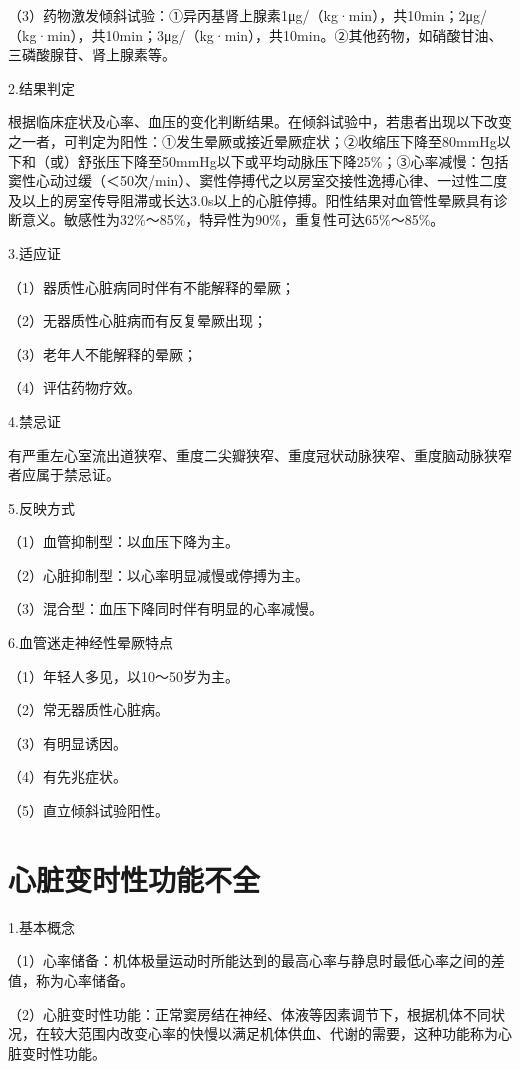 （3）药物激发倾斜试验：①异丙基肾上腺素1μg/（kg·min），共10min；2μg/（kg·min），共10min；3μg/（kg·min），共10min。②其他药物，如硝酸甘油、三磷酸腺苷、肾上腺素等。

2.结果判定

根据临床症状及心率、血压的变化判断结果。在倾斜试验中，若患者出现以下改变之一者，可判定为阳性：①发生晕厥或接近晕厥症状；②收缩压下降至80mmHg以下和（或）舒张压下降至50mmHg以下或平均动脉压下降25\%；③心率减慢：包括窦性心动过缓（＜50次/min）、窦性停搏代之以房室交接性逸搏心律、一过性二度及以上的房室传导阻滞或长达3.0s以上的心脏停搏。阳性结果对血管性晕厥具有诊断意义。敏感性为32\%～85\%，特异性为90\%，重复性可达65\%～85\%。

3.适应证

（1）器质性心脏病同时伴有不能解释的晕厥；

（2）无器质性心脏病而有反复晕厥出现；

（3）老年人不能解释的晕厥；

（4）评估药物疗效。

4.禁忌证

有严重左心室流出道狭窄、重度二尖瓣狭窄、重度冠状动脉狭窄、重度脑动脉狭窄者应属于禁忌证。

5.反映方式

（1）血管抑制型：以血压下降为主。

（2）心脏抑制型：以心率明显减慢或停搏为主。

（3）混合型：血压下降同时伴有明显的心率减慢。

6.血管迷走神经性晕厥特点

（1）年轻人多见，以10～50岁为主。

（2）常无器质性心脏病。

（3）有明显诱因。

（4）有先兆症状。

（5）直立倾斜试验阳性。

\protect\hypertarget{text00056.htmlux5cux23subid669}{}{}

\section{心脏变时性功能不全}

1.基本概念

（1）心率储备：机体极量运动时所能达到的最高心率与静息时最低心率之间的差值，称为心率储备。

（2）心脏变时性功能：正常窦房结在神经、体液等因素调节下，根据机体不同状况，在较大范围内改变心率的快慢以满足机体供血、代谢的需要，这种功能称为心脏变时性功能。

